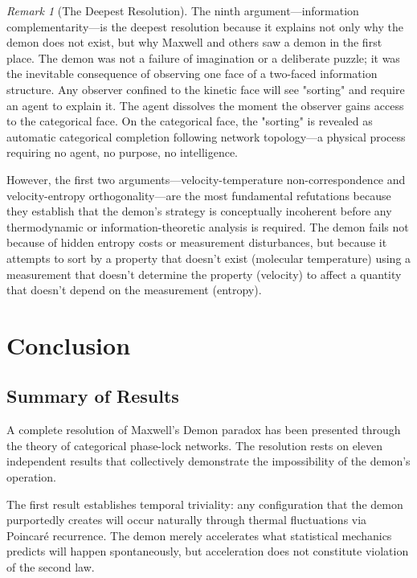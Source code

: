 \documentclass[12pt,a4paper]{article}
\theoremstyle{definition}
\theoremstyle{remark}
\newtheorem{remark}[theorem]{Remark}
\begin{document}
\begin{remark}[The Deepest Resolution]
\label{rem:deepest_resolution}
The ninth argument—information complementarity—is the deepest resolution because it explains not only why the demon does not exist, but why Maxwell and others saw a demon in the first place. The demon was not a failure of imagination or a deliberate puzzle; it was the inevitable consequence of observing one face of a two-faced information structure. Any observer confined to the kinetic face will see "sorting" and require an agent to explain it. The agent dissolves the moment the observer gains access to the categorical face. On the categorical face, the "sorting" is revealed as automatic categorical completion following network topology—a physical process requiring no agent, no purpose, no intelligence.

However, the first two arguments—velocity-temperature non-correspondence and velocity-entropy orthogonality—are the most fundamental refutations because they establish that the demon's strategy is conceptually incoherent before any thermodynamic or information-theoretic analysis is required. The demon fails not because of hidden entropy costs or measurement disturbances, but because it attempts to sort by a property that doesn't exist (molecular temperature) using a measurement that doesn't determine the property (velocity) to affect a quantity that doesn't depend on the measurement (entropy).
\end{remark}


\section{Conclusion}
\label{sec:conclusion}

\subsection{Summary of Results}

A complete resolution of Maxwell's Demon paradox has been presented through the theory of categorical phase-lock networks. The resolution rests on eleven independent results that collectively demonstrate the impossibility of the demon's operation.

The first result establishes temporal triviality: any configuration that the demon purportedly creates will occur naturally through thermal fluctuations via Poincaré recurrence. The demon merely accelerates what statistical mechanics predicts will happen spontaneously, but acceleration does not constitute violation of the second law.
\end{document}
